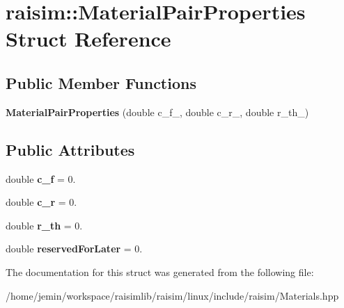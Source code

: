 \hypertarget{structraisim_1_1MaterialPairProperties}{}\section{raisim\+:\+:Material\+Pair\+Properties Struct Reference}
\label{structraisim_1_1MaterialPairProperties}
\subsection*{Public Member Functions}
\begin{DoxyCompactItemize}
\item 
\mbox{\label{structraisim_1_1MaterialPairProperties_ac973876ea2cf6616c16bdbf7f6734473}} 
{\bfseries Material\+Pair\+Properties} (double c\+\_\+f\+\_\+, double c\+\_\+r\+\_\+, double r\+\_\+th\+\_\+)
\end{DoxyCompactItemize}
\subsection*{Public Attributes}
\begin{DoxyCompactItemize}
\item 
\mbox{\label{structraisim_1_1MaterialPairProperties_a29c2eab053b225b5dafd87f4ce2627fc}} 
double {\bfseries c\+\_\+f} = 0.
\item 
\mbox{\label{structraisim_1_1MaterialPairProperties_a8030429aaf12b486d45611638a407408}} 
double {\bfseries c\+\_\+r} = 0.
\item 
\mbox{\label{structraisim_1_1MaterialPairProperties_aa4a2fa1342eaea798d6f5b5abdfd3d49}} 
double {\bfseries r\+\_\+th} = 0.
\item 
\mbox{\label{structraisim_1_1MaterialPairProperties_aace2852a74d9a079f50af69d1c43be1d}} 
double {\bfseries reserved\+For\+Later} = 0.
\end{DoxyCompactItemize}


The documentation for this struct was generated from the following file\+:\begin{DoxyCompactItemize}
\item 
/home/jemin/workspace/raisimlib/raisim/linux/include/raisim/Materials.\+hpp\end{DoxyCompactItemize}
